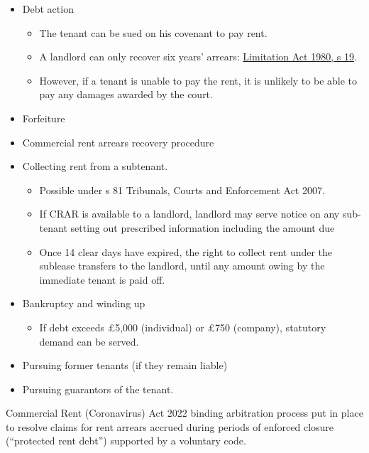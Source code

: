 \documentclass[
]{article}
\providecommand{\tightlist}{%
  \setlength{\itemsep}{0pt}\setlength{\parskip}{0pt}}
\begin{document}
\begin{itemize}
\tightlist
\item
  Debt action

  \begin{itemize}
  \tightlist
  \item
    The tenant can be sued on his covenant to pay rent.
  \item
    A landlord can only recover six years' arrears:
    \href{https://www.legislation.gov.uk/ukpga/1980/58/section/19}{Limitation
    Act 1980, s 19}.
  \item
    However, if a tenant is unable to pay the rent, it is unlikely to be
    able to pay any damages awarded by the court.
  \end{itemize}
\item
  Forfeiture
\item
  Commercial rent arrears recovery procedure
\item
  Collecting rent from a subtenant.

  \begin{itemize}
  \tightlist
  \item
    Possible under s 81 Tribunals, Courts and Enforcement Act 2007.
  \item
    If CRAR is available to a landlord, landlord may serve notice on any
    sub-tenant setting out prescribed information including the amount
    due
  \item
    Once 14 clear days have expired, the right to collect rent under the
    sublease transfers to the landlord, until any amount owing by the
    immediate tenant is paid off.
  \end{itemize}
\item
  Bankruptcy and winding up

  \begin{itemize}
  \tightlist
  \item
    If debt exceeds £5,000 (individual) or £750 (company), statutory
    demand can be served.
  \end{itemize}
\item
  Pursuing former tenants (if they remain liable)
\item
  Pursuing guarantors of the tenant.
\end{itemize}

Commercial Rent (Coronavirus) Act 2022 binding arbitration process put
in place to resolve claims for rent arrears accrued during periods of
enforced closure (``protected rent debt'') supported by a voluntary
code.
\end{document}
